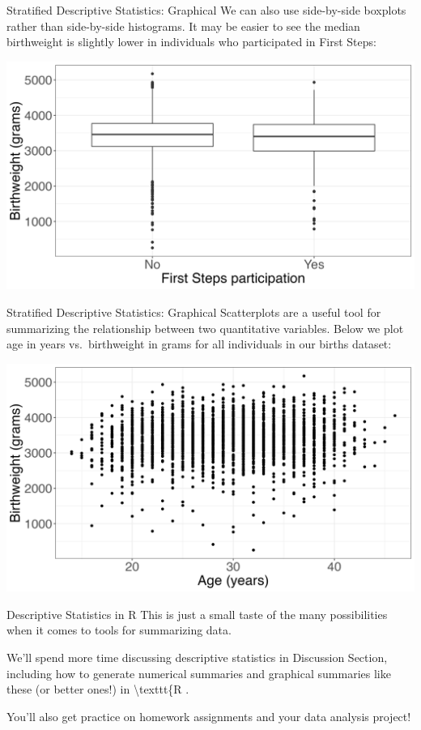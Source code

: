 \documentclass[
  ignorenonframetext,
]{beamer}
\begin{document}
\begin{frame}{Stratified Descriptive Statistics: Graphical}
\protect\hypertarget{stratified-descriptive-statistics-graphical-2}{}
We can also use side-by-side boxplots rather than side-by-side
histograms. It may be easier to see the median birthweight is slightly
lower in individuals who participated in First Steps:

\includegraphics{fs_box_firstep.png}
\end{frame}

\begin{frame}{Stratified Descriptive Statistics: Graphical}
\protect\hypertarget{stratified-descriptive-statistics-graphical-3}{}
Scatterplots are a useful tool for summarizing the relationship between
two quantitative variables. Below we plot age in years vs.~birthweight
in grams for all individuals in our births dataset:

\includegraphics{fs_scatter.png}
\end{frame}

\begin{frame}{Descriptive Statistics in R}
\protect\hypertarget{descriptive-statistics-in-r}{}
This is just a small taste of the many possibilities when it comes to
tools for summarizing data.

We'll spend more time discussing descriptive statistics in Discussion
Section, including how to generate numerical summaries and graphical
summaries like these (or better ones!) in \textbackslash texttt\{R .

You'll also get practice on homework assignments and your data analysis
project!
\end{frame}
\end{document}
